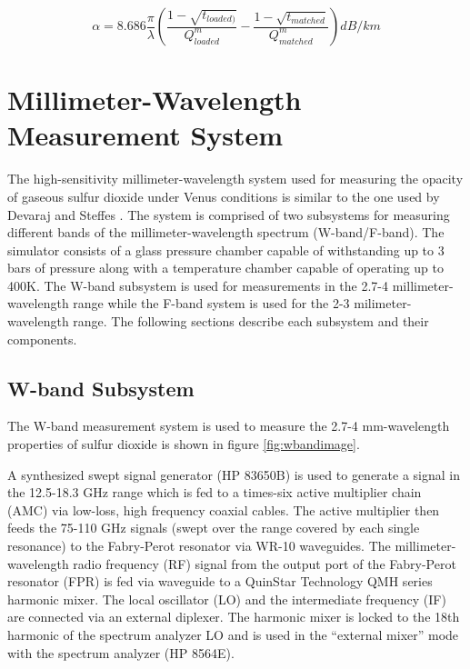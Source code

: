\begin{equation} \label{eq:alphamatch}
\alpha = 8.686 \frac{\pi}{\lambda}\left(\frac{1 - \sqrt{t_{loaded)}}}{Q^m_{loaded}} - \frac{1-\sqrt{t_{matched}}}{Q_{matched}^m} \right) dB/km
\end{equation}

\section{Millimeter-Wavelength Measurement System}

The high-sensitivity millimeter-wavelength system used for measuring the opacity of gaseous sulfur dioxide under Venus conditions is similar to the one used by Devaraj and Steffes \cite{Devaraj-2011} \cite{Devaraj-thesis}. The system is comprised of two subsystems for measuring different bands of the millimeter-wavelength spectrum (W-band/F-band). The simulator consists of a glass pressure chamber capable of withstanding up to 3 bars of pressure along with a temperature chamber capable of operating up to 400K. The W-band subsystem is used for measurements in the 2.7-4 millimeter-wavelength range while the F-band system is used for the 2-3 milimeter-wavelength range. The following sections describe each subsystem and their components. 

\subsection{W-band Subsystem}

The W-band measurement system is used to measure the 2.7-4 mm-wavelength properties of sulfur dioxide is shown in figure \ref{fig:wbandimage}.

A synthesized swept signal generator (HP 83650B) is used to generate a signal in the 12.5-18.3 GHz range which is fed to a times-six active multiplier chain (AMC) via low-loss, high frequency coaxial cables. The active multiplier then feeds the 75-110 GHz signals (swept over the range covered by each single resonance) to the Fabry-Perot resonator via WR-10 waveguides. The millimeter-wavelength radio frequency (RF) signal from the output port of the Fabry-Perot resonator (FPR) is fed via waveguide to a QuinStar Technology QMH series harmonic mixer. The local oscillator (LO) and the intermediate frequency (IF) are connected via an external diplexer. The harmonic mixer is locked to the 18th harmonic of the spectrum analyzer LO and is used in the ``external mixer'' mode with the spectrum analyzer (HP 8564E). 

